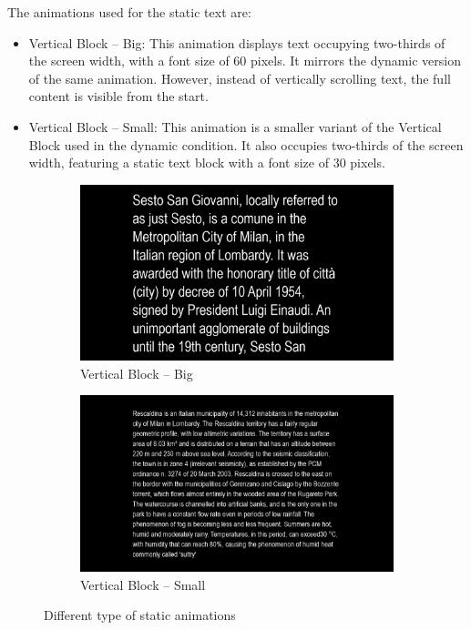 \documentclass{article}
\begin{document}
The animations used for the static text are:
\begin{itemize}
\item Vertical Block – Big: This animation displays text occupying two-thirds of the screen width, with a font size of 60 pixels. 
It mirrors the dynamic version of the same animation.
However, instead of vertically scrolling text, the full content is visible from the start.
\item Vertical Block – Small: This animation is a smaller variant of the Vertical Block used in the dynamic condition. 
It also occupies two-thirds of the screen width, featuring a static text block with a font size of 30 pixels.
\end{itemize}

\begin{figure}[htbp]
    \centering
    \begin{subfigure}[t]{0.45\textwidth}
        \centering
        \includegraphics[width=\linewidth]{Images/Experiment/BIG_static.png}
        \caption{Vertical Block – Big}
        \label{fig:static_big}
    \end{subfigure}
    \hfill
    \begin{subfigure}[t]{0.45\textwidth}
        \centering
        \includegraphics[width=\linewidth]{Images/Experiment/LIT_static.png}
        \caption{Vertical Block – Small}
        \label{fig:static_small}
    \end{subfigure}
    \caption{Different type of static animations}
    \label{fig:statics}
\end{figure}
\end{document}
